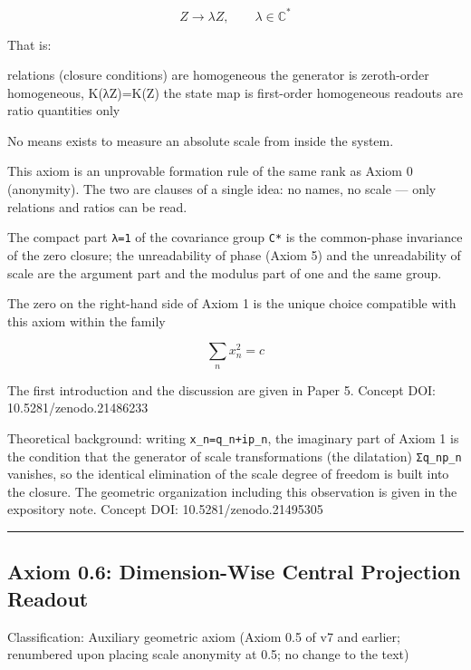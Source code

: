 \documentclass[
  a4paper,
]{article}
\newenvironment{Shaded}{}{}
\newcommand{\NormalTok}[1]{#1}
\begin{document}
\[
Z\to\lambda Z,\qquad\lambda\in\mathbb{C}^\ast
\]

That is:

\begin{Shaded}
\begin{Highlighting}[]
\NormalTok{relations (closure conditions) are homogeneous}
\NormalTok{the generator is zeroth{-}order homogeneous, K(λZ)=K(Z)}
\NormalTok{the state map is first{-}order homogeneous}
\NormalTok{readouts are ratio quantities only}
\end{Highlighting}
\end{Shaded}

No means exists to measure an absolute scale from inside the system.

This axiom is an unprovable formation rule of the same rank as Axiom 0
(anonymity). The two are clauses of a single idea: no names, no scale
--- only relations and ratios can be read.

The compact part \texttt{\textbar{}λ\textbar{}=1} of the covariance
group \texttt{C*} is the common-phase invariance of the zero closure;
the unreadability of phase (Axiom 5) and the unreadability of scale are
the argument part and the modulus part of one and the same group.

The zero on the right-hand side of Axiom 1 is the unique choice
compatible with this axiom within the family

\[
\sum_n x_n^2=c
\]

The first introduction and the discussion are given in Paper 5. Concept
DOI: 10.5281/zenodo.21486233

Theoretical background: writing \texttt{x\_n=q\_n+ip\_n}, the imaginary
part of Axiom 1 is the condition that the generator of scale
transformations (the dilatation) \texttt{Σq\_np\_n} vanishes, so the
identical elimination of the scale degree of freedom is built into the
closure. The geometric organization including this observation is given
in the expository note. Concept DOI: 10.5281/zenodo.21495305

\begin{center}\rule{0.5\linewidth}{0.5pt}\end{center}

\subsection{Axiom 0.6: Dimension-Wise Central Projection
Readout}\label{axiom-0.6-dimension-wise-central-projection-readout}

Classification: Auxiliary geometric axiom (Axiom 0.5 of v7 and earlier;
renumbered upon placing scale anonymity at 0.5; no change to the text)
\end{document}
